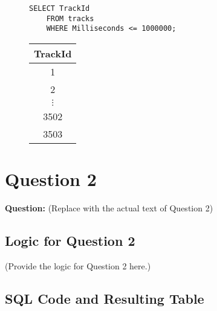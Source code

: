 \documentclass{article}
\begin{document}
\begin{figure}[h!]
\centering
\begin{minipage}{0.48\textwidth}
\begin{lstlisting}[caption=Code 1: SQL Code for Question 1, label=lst:sql_q1]
    SELECT TrackId
    FROM tracks
    WHERE Milliseconds <= 1000000;
\end{lstlisting}
\end{minipage}%
\hfill%
\begin{minipage}{0.48\textwidth}
\centering
\begin{tabular}{c}
    \toprule
    TrackId \\
    \midrule
    1 \\
    2 \\
    $\vdots$ \\
    3502 \\
    3503 \\
    \bottomrule
\end{tabular}
\label{tab:result_q1}
\end{minipage}
\end{figure}

\section*{Question 2}

\textbf{Question:} (Replace with the actual text of Question 2)

\subsection*{Logic for Question 2}

(Provide the logic for Question 2 here.)

\subsection*{SQL Code and Resulting Table}
\end{document}
